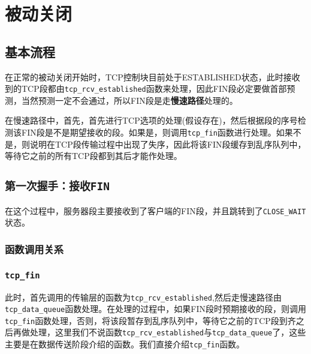 \section{被动关闭}
\label{sec:passive_close}

    \subsection{基本流程}
        在正常的被动关闭开始时，TCP控制块目前处于ESTABLISHED状态，此时接收到的TCP段都由\texttt{tcp_rcv_established}函数来处理，因此FIN段必定要做首部预测，当然预测一定不会通过，所以FIN段是走\textbf{慢速路径}处理的。

        在慢速路径中，首先，首先进行TCP选项的处理(假设存在)，然后根据段的序号检测该FIN段是不是期望接收的段。如果是，则调用\texttt{tcp_fin}函数进行处理。如果不是，则说明在TCP段传输过程中出现了失序，因此将该FIN段缓存到乱序队列中，等待它之前的所有TCP段都到其后才能作处理。

    \subsection{\texttt{第一次握手：接收FIN}}

        在这个过程中，服务器段主要接收到了客户端的FIN段，并且跳转到了\texttt{CLOSE_WAIT}状态。
        \subsubsection{函数调用关系}
        

        \subsubsection{\texttt{tcp_fin}}
        \label{subsubsec:tcp_fin}

            此时，首先调用的传输层的函数为\texttt{tcp_rcv_established},然后走慢速路径由\texttt{tcp_data_queue}函数处理。在处理的过程中，如果FIN段时预期接收的段，则调用\texttt{tcp_fin}函数处理，否则，将该段暂存到乱序队列中，等待它之前的TCP段到齐之后再做处理，这里我们不说函数\texttt{tcp_rcv_established}与\texttt{tcp_data_queue}了，这些主要是在数据传送阶段介绍的函数。我们直接介绍\texttt{tcp_fin}函数。

